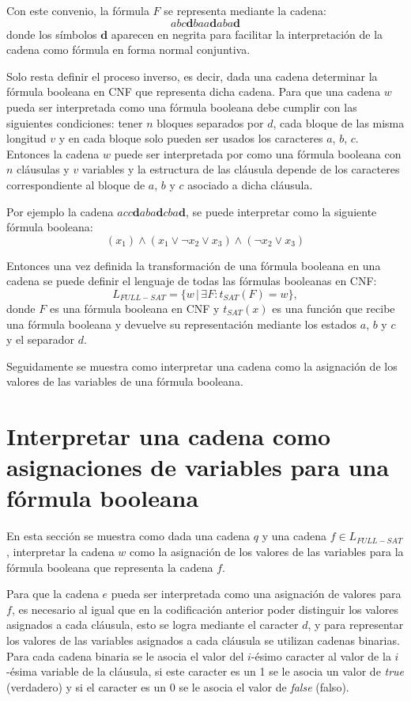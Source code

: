 \documentclass[12pt]{article}
\begin{document}
Con este convenio, la fórmula $F$ se representa mediante la cadena:
$$abc\mathbf{d}baa\mathbf{d}aba\mathbf{d}$$
donde los símbolos $\mathbf{d}$ aparecen en negrita para facilitar la interpretación de la cadena como fórmula en forma normal conjuntiva.

Solo resta definir el proceso inverso, es decir, dada una cadena determinar la fórmula booleana en CNF que representa dicha cadena.
Para que una cadena $w$ pueda ser interpretada como una fórmula booleana debe cumplir con las siguientes condiciones:
tener $n$ bloques separados por $d$, cada bloque de las misma longitud $v$ y en cada bloque solo pueden ser usados los caracteres
$a$, $b$, $c$. Entonces la cadena $w$ puede ser interpretada por como una fórmula booleana con $n$ cláusulas y $v$ variables y la estructura
de las cláusula depende de los caracteres correspondiente al bloque de $a$, $b$ y $c$ asociado a dicha cláusula.

Por ejemplo la cadena $acc\mathbf{d}aba\mathbf{d}cba\mathbf{d}$, se puede interpretar como la siguiente fórmula booleana:
$$(x_1)\wedge(x_1\vee \neg x_2 \vee x_3) \wedge (\neg x_2\vee x_3)$$

Entonces una vez definida la transformación de una fórmula booleana en una cadena se puede definir el lenguaje
de todas las fórmulas booleanas en CNF:
$$L_{FULL-SAT}=\{w\,|\,\exists F : t_{SAT}(F)=w\},$$
donde $F$ es una fórmula booleana en CNF y $t_{SAT}(x)$ es una función que recibe una fórmula booleana y devuelve
su representación mediante los estados $a$, $b$ y $c$ y el separador $d$.

Seguidamente se muestra como interpretar una cadena como la asignación de los valores de las variables de una fórmula
booleana.

\section{Interpretar una cadena como asignaciones de variables para una fórmula booleana}
\label{sec:intsat}

En esta sección se muestra como dada una cadena $q$ y una cadena $f\in L_{FULL-SAT}$, interpretar 
la cadena $w$ como la asignación de los valores de las variables para la fórmula booleana que representa
la cadena $f$.

Para que la cadena $e$ pueda ser interpretada como una asignación de valores para $f$, es necesario al igual
que en la codificación anterior poder distinguir los valores asignados a cada cláusula, esto se logra mediante
el caracter $d$, y para representar los valores de las variables asignados a cada cláusula se utilizan 
cadenas binarias. Para cada cadena binaria se le asocia el valor del $i$-ésimo caracter al valor de la $i$-ésima
variable de la cláusula, si este caracter es un 1 se le asocia un valor de \textit{true} (verdadero) y si el 
caracter es un 0 se le asocia el valor de \textit{false} (falso).
\end{document}
